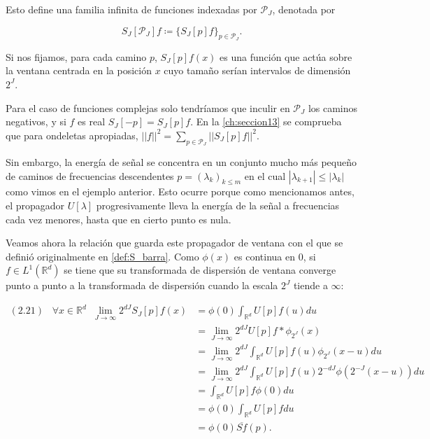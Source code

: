 \noindent Esto define una familia infinita de funciones indexadas por $\mathcal{P}_J$, denotada por

$$S_J[\mathcal{P}_J]f \coloneqq \lbrace S_J[p]f \rbrace_{p\in\mathcal{P}_J}.$$

\medskip

\noindent Si nos fijamos, para cada camino $p$, $S_J[p]f(x)$ es una función que actúa sobre la ventana centrada en la posición $x$ cuyo tamaño serían intervalos de dimensión $2^J$.

\medskip

\noindent Para el caso de funciones complejas solo tendríamos que inculir en $\mathcal{P}_J$ los caminos negativos, y si $f$ es real $S_J[-p]=S_J[p]f$.
\noindent En la \autoref{ch:seccion13} se comprueba que para ondeletas apropiadas, $||f||^2=\sum_{p\in\mathcal{P}_J}\left|\left|S_J[p]f\right|\right|^2$. 

\medskip

\noindent Sin embargo, la energía de señal se concentra en un conjunto mucho más pequeño de caminos de frecuencias descendentes $p=(\lambda_k)_{k\leq m}$ en el cual $|\lambda_{k+1}| \leq |\lambda_k|$ como vimos en el ejemplo anterior. Esto ocurre porque como mencionamos antes, el propagador $U[\lambda]$ progresivamente lleva la energía de la señal a frecuencias cada vez menores, hasta que en cierto punto es nula.

\medskip

\noindent Veamos ahora la relación que guarda este propagador de ventana con el que se definió originalmente en \autoref{def:S_barra}. Como $\phi(x)$ es continua en $0$, si $f\in L^1 (\mathbb{R}^d)$ se tiene que su transformada de dispersión de ventana converge punto a punto a la transformada de dispersión cuando la escala $2^J$ tiende a $\infty$: 

\begin{align*}
    (2.21) \;\;\; \forall x \in \mathbb{R}^d \;\; \lim_{J \rightarrow \infty} 2^{dJ} S_J[p]f(x) &=\phi(0)\int_{\mathbb{R}^d}U[p]f(u) du \\
    &=\lim_{J \rightarrow \infty} 2^{dJ} U[p]f \ast \phi_{2^J}(x) \\
    &=\lim_{J \rightarrow \infty} 2^{dJ} \int_{\mathbb{R}^d} U[p]f(u)\phi_{2^J}(x-u) du \\
    &=\lim_{J \rightarrow \infty} 2^{dJ} \int_{\mathbb{R}^d} U[p]f(u) 2^{-dJ} \phi(2^{-J}(x-u)) du   \\
    &= \int_{\mathbb{R}^d} U[p]f \phi(0) du  \\
    &= \phi(0) \int_{\mathbb{R}^d} U[p]f du  \\
    &= \phi(0)\overline{Sf}(p).\\ 
\end{align*}

